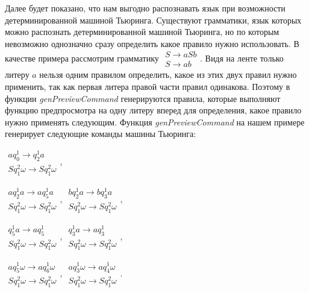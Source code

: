 \documentclass[14pt]{matmex-diploma-custom}
\begin{document}
Далее будет показано, что нам выгодно распознавать язык при возможности детерминированной машиной Тьюринга. Существуют грамматики, язык которых 
можно распознать детерминированной машиной Тьюринга, но по которым невозможно однозначно сразу определить какое правило нужно использовать. В качестве примера рассмотрим грамматику 
$\begin{array}{lcl}
    S \to a S b \\
    S \to a b
\end{array}$. Видя на ленте только литеру $a$ нельзя одним правилом определить, какое из этих двух правил нужно применить, так как первая литера  правой части правил одинакова. Поэтому в функции \textit{genPreviewCommand} генерируются правила, которые выполняют функцию предпросмотра на одну литеру вперед для определения, какое правило нужно применять следующим. Функция \textit{genPreviewCommand} на нашем примере генерирует следующие команды машины Тьюринга: 

$\begin{array}{lcl}
    a q_0^1 \to q_2^1 a \\
    S q_1^2 \omega \to S q_1^2 \omega 
\end{array}$,

$\begin{array}{lcl}
    a q_2^1 a \to a q_5^1 a \\
    S q_1^2 \omega \to S q_1^2 \omega 
\end{array}$,
$\begin{array}{lcl}
    b q_2^1 a \to b q_3^1 a \\
    S q_1^2 \omega \to S q_1^2 \omega 
\end{array}$,

$\begin{array}{lcl}
    q_5^1 a \to a q_5^1 \\
    S q_1^2 \omega \to S q_1^2 \omega 
\end{array}$,
$\begin{array}{lcl}
    q_3^1 a \to a q_3^1 \\
    S q_1^2 \omega \to S q_1^2 \omega 
\end{array}$,

$\begin{array}{lcl}
    a q_5^1 \omega \to a q_6^1 \omega \\
    S q_1^2 \omega \to S q_1^2 \omega 
\end{array}$,
$\begin{array}{lcl}
    a q_3^1 \omega \to a q_4^1 \omega \\
    S q_1^2 \omega \to S q_1^2 \omega 
\end{array}$.
\end{document}
